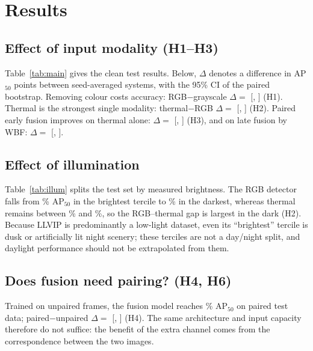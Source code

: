 \documentclass[conference]{IEEEtran}
\newif\ifpending \pendingtrue
\newcommand{\pending}[1]{\ifpending{\color{orange!85!black}#1}\else#1\fi}
\begin{document}
\section{Results}



\subsection{Effect of input modality (H1--H3)}
Table~\ref{tab:main} gives the clean test results. Below, $\Delta$ denotes a difference in AP$_{50}$ points between seed-averaged systems, with the 95\% CI of the paired bootstrap. \pending{Removing colour costs accuracy: RGB$-$grayscale $\Delta={}$\RDiffRgbVsGrayApFiftyEst{} [\RDiffRgbVsGrayApFiftyLo, \RDiffRgbVsGrayApFiftyHi] (H1).} \pending{Thermal is the strongest single modality: thermal$-$RGB $\Delta={}$\RDiffIrVsRgbApFiftyEst{} [\RDiffIrVsRgbApFiftyLo, \RDiffIrVsRgbApFiftyHi] (H2).} \pending{Paired early fusion improves on thermal alone: $\Delta={}$\RDiffRgbtVsIrApFiftyEst{} [\RDiffRgbtVsIrApFiftyLo, \RDiffRgbtVsIrApFiftyHi] (H3), and on late fusion by WBF: $\Delta={}$\RDiffRgbtVsLateWbfApFiftyEst{} [\RDiffRgbtVsLateWbfApFiftyLo, \RDiffRgbtVsLateWbfApFiftyHi].}



\subsection{Effect of illumination}
Table~\ref{tab:illum} splits the test set by measured brightness. \pending{The RGB detector falls from \RRgbLumHighApFifty\% AP$_{50}$ in the brightest tercile to \RRgbLumLowApFifty\% in the darkest, whereas thermal remains between \RIrLumLowApFifty\% and \RIrLumHighApFifty\%, so the RGB--thermal gap is largest in the dark (H2).} Because LLVIP is predominantly a low-light dataset, even its ``brightest'' tercile is dusk or artificially lit night scenery; these terciles are not a day/night split, and daylight performance should not be extrapolated from them.

\subsection{Does fusion need pairing? (H4, H6)}
\pending{Trained on unpaired frames, the fusion model reaches \RRgbtUnpairedCleanApFifty\% AP$_{50}$ on paired test data; paired$-$unpaired $\Delta={}$\RDiffRgbtVsRgbtUnpairedApFiftyEst{} [\RDiffRgbtVsRgbtUnpairedApFiftyLo, \RDiffRgbtVsRgbtUnpairedApFiftyHi] (H4).} The same architecture and input capacity therefore do not suffice: the benefit of the extra channel comes from the correspondence between the two images.
\end{document}
